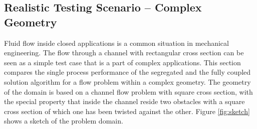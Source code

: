 

\subsection{Realistic Testing Scenario -- Complex Geometry}
\label{sec:channel}

Fluid flow inside closed applications is a common situation in mechanical engineering. The flow through a channel with rectangular cross section can be seen as a simple test case that is a part of complex applications. This section compares the single process performance of the segregated and the fully coupled solution algorithm for a flow problem within a complex geometry. The geometry of the domain is based on a channel flow problem with square cross section, with the special property that inside the channel reside two obstacles with a square cross section of which one has been twisted against the other. Figure \ref{fig:sketch} shows a sketch of the problem domain. 


